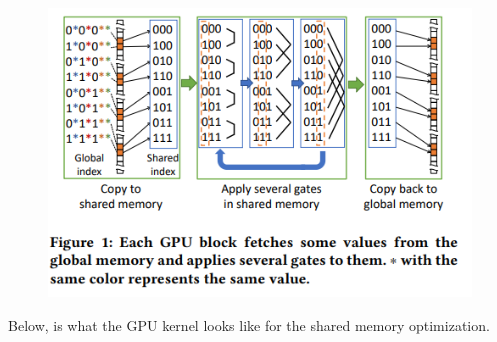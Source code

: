 \documentclass{article}
\begin{document}
\begin{figure}[H]
	\centerline{\includegraphics[width=6in]{figures/sharedmem.png}}
\end{figure}

Below, is what the GPU kernel looks like for the shared memory optimization.
\end{document}

